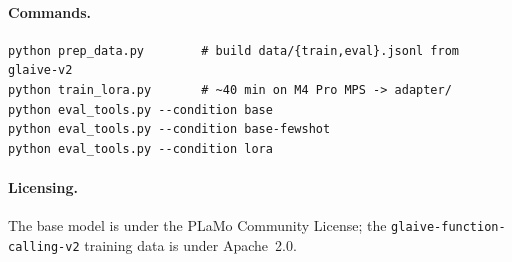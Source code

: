 \documentclass[10pt]{article}
\begin{document}
\paragraph{Commands.}
\begin{verbatim}
python prep_data.py        # build data/{train,eval}.jsonl from glaive-v2
python train_lora.py       # ~40 min on M4 Pro MPS -> adapter/
python eval_tools.py --condition base
python eval_tools.py --condition base-fewshot
python eval_tools.py --condition lora
\end{verbatim}

\paragraph{Licensing.}
The base model is under the PLaMo Community License; the
\texttt{glaive-function-calling-v2} training data is under Apache~2.0.
\end{document}
